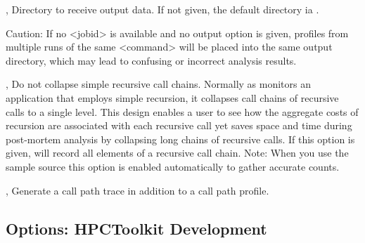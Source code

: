 \documentclass[english]{article}
\begin{document}
\begin{Description}
\item[\OptArg{-o}{outpath}, \OptArg{--output}{outpath}]
Directory to receive output data.
If not given, the default directory ia .
\begin{itemize}
 Caution: If no <jobid> is available and no output option is given,
 profiles from multiple runs of the same <command> will be placed into the same output directory,
 which may lead to confusing or incorrect analysis results.
\end{itemize}

 \item[\Opt{-r}, \Opt{--retain-recursion}]
Do not collapse simple recursive call chains.
Normally as  monitors an application that employs simple recursion, it collapses call chains of recursive calls to a single level. 
This design enables a user to see how the aggregate costs of recursion are associated with each recursive call yet
saves space and time during post-mortem analysis by collapsing long chains of recursive calls.
If this option is given,  will record all elements of a recursive call chain.
Note: When you use the  sample source this option is enabled automatically
to gather accurate counts.

\item[\Opt{-t}, \Opt{--trace}]
Generate a call path trace in addition to a call path profile.

\end{Description}

\subsection{Options: HPCToolkit Development}
\end{document}
